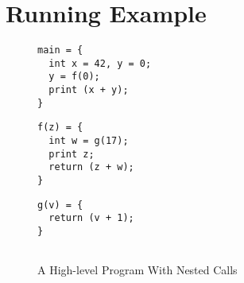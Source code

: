 \documentclass[acmsmall,review,anonymous]{acmart}\settopmatter{printfolios=true,printccs=false,printacmref=false}
\begin{document}
%
%
%
%
%
%
%
%
%

\section{Running Example}
\label{sec:running-example}

\begin{figure}[b]
\hfill
    \begin{minipage}{.3\textwidth}
\begin{verbatim}
main = {
  int x = 42, y = 0;
  y = f(0);
  print (x + y);
}
\end{verbatim}
    \end{minipage}
    \begin{minipage}{.3\textwidth}
\begin{verbatim}
f(z) = {
  int w = g(17);
  print z;
  return (z + w);
}
\end{verbatim}
    \end{minipage}
    \begin{minipage}{.3\textwidth}
\begin{verbatim}
g(v) = {
  return (v + 1);
}


\end{verbatim}
    \end{minipage}
\caption{A High-level Program With Nested Calls}
\label{fig:running-program}
\end{figure}
\end{document}
